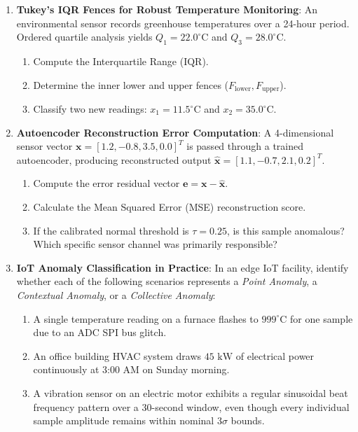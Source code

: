 \begin{checkyourself}
\begin{enumerate}
    \item \textbf{Tukey's IQR Fences for Robust Temperature Monitoring}:
    An environmental sensor records greenhouse temperatures over a 24-hour period. Ordered quartile analysis yields $Q_1 = 22.0^\circ\text{C}$ and $Q_3 = 28.0^\circ\text{C}$.
    \begin{enumerate}[label=(\alph*)]
        \item Compute the Interquartile Range ($\text{IQR}$).
        \item Determine the inner lower and upper fences ($F_{\text{lower}}, F_{\text{upper}}$).
        \item Classify two new readings: $x_1 = 11.5^\circ\text{C}$ and $x_2 = 35.0^\circ\text{C}$.
    \end{enumerate}

    \item \textbf{Autoencoder Reconstruction Error Computation}:
    A 4-dimensional sensor vector $\mathbf{x} = [1.2, -0.8, 3.5, 0.0]^T$ is passed through a trained autoencoder, producing reconstructed output $\hat{\mathbf{x}} = [1.1, -0.7, 2.1, 0.2]^T$.
    \begin{enumerate}[label=(\alph*)]
        \item Compute the error residual vector $\mathbf{e} = \mathbf{x} - \hat{\mathbf{x}}$.
        \item Calculate the Mean Squared Error (MSE) reconstruction score.
        \item If the calibrated normal threshold is $\tau = 0.25$, is this sample anomalous? Which specific sensor channel was primarily responsible?
    \end{enumerate}

    \item \textbf{IoT Anomaly Classification in Practice}:
    In an edge IoT facility, identify whether each of the following scenarios represents a \textit{Point Anomaly}, a \textit{Contextual Anomaly}, or a \textit{Collective Anomaly}:
    \begin{enumerate}[label=(\alph*)]
        \item A single temperature reading on a furnace flashes to $999^\circ\text{C}$ for one sample due to an ADC SPI bus glitch.
        \item An office building HVAC system draws $45\text{ kW}$ of electrical power continuously at 3:00 AM on Sunday morning.
        \item A vibration sensor on an electric motor exhibits a regular sinusoidal beat frequency pattern over a 30-second window, even though every individual sample amplitude remains within nominal $3\sigma$ bounds.
    \end{enumerate}
\end{enumerate}
\end{checkyourself}

